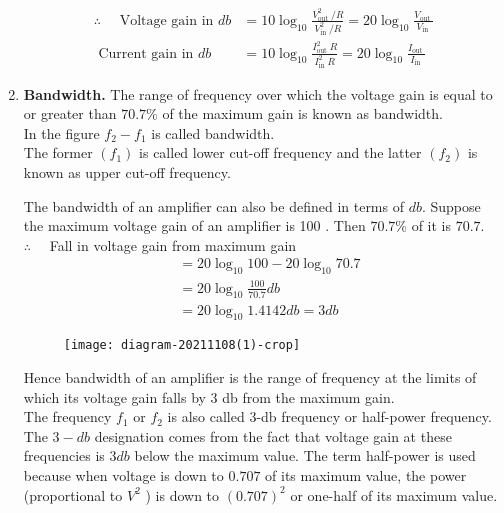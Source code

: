 \begin{enumerate}
$$\begin{aligned}
 \therefore \quad \text { Voltage gain in } d b &=10 \log _{10} \frac{V_{\text {out }}^{2} / R}{V_{\text {in }}^{2} / R}=20 \log _{10} \frac{V_{\text {out }}}{V_{\text {in }}} \\
 \text { Current gain in } d b &=10 \log _{10} \frac{I_{\text {out }}^{2} R}{I_{\text {in }}^{2} R}=20 \log _{10} \frac{I_{\text {out }}}{I_{\text {in }}}
 \end{aligned}
 $$
 \item \textbf{Bandwidth.}
 The range of frequency over which the voltage gain is equal to or greater than
 $70.7\%$ of the maximum gain is known as bandwidth.\\
In the figure $f_2-f_1$ is called bandwidth.\\
  The former $\left(f_{1}\right)$ is called lower cut-off frequency and the latter $\left(f_{2}\right)$ is known as upper cut-off frequency. 
  \begin{minipage}{0.5\textwidth}
  	The bandwidth of an amplifier can also be defined in terms of $d b$. Suppose the maximum voltage gain of an amplifier is 100 . Then $70.7 \%$ of it is $70.7$.
  	$\therefore \quad$ Fall in voltage gain from maximum gain
  	$$
  	\begin{aligned}
  	&=20 \log _{10} 100-20 \log _{10} 70.7 \\
  	&=20 \log _{10} \frac{100}{70.7} d b \\
  	&=20 \log _{10} 1.4142 d b=3 d b
  	\end{aligned}
  	$$
  \end{minipage}
  \begin{minipage}{0.5\textwidth}
  	 \begin{figure}[H]
  		\centering
  		\texttt{[image: diagram-20211108(1)-crop]}
  		\caption{}
  		\label{}
  	\end{figure}
  \end{minipage}
  Hence bandwidth of an amplifier is the range of frequency at the limits of which its voltage gain falls by 3 db from the maximum gain.\\
  The frequency $f_{1}$ or $f_{2}$ is also called 3-db frequency or half-power frequency.\\
  The $3-d b$ designation comes from the fact that voltage gain at these frequencies is $3 d b$ below the maximum value. The term half-power is used because when voltage is down to $0.707$ of its maximum value, the power (proportional to $V^{2}$ ) is down to $(0.707)^{2}$ or one-half of its maximum value.
 \end{enumerate}
